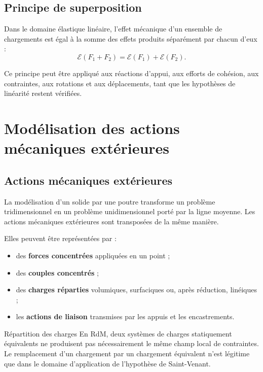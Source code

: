 \subsection{Principe de superposition}

Dans le domaine élastique linéaire, l'effet mécanique d'un ensemble de chargements est égal à la somme des effets produits séparément par chacun d'eux :
\[
\mathcal E(F_1+F_2)=\mathcal E(F_1)+\mathcal E(F_2).
\]

\TLRDMSuperposition

Ce principe peut être appliqué aux réactions d'appui, aux efforts de cohésion, aux contraintes, aux rotations et aux déplacements, tant que les hypothèses de linéarité restent vérifiées.

\section{Modélisation des actions mécaniques extérieures}
\label{sec:rdm-3}

\subsection{Actions mécaniques extérieures}

La modélisation d'un solide par une poutre transforme un problème tridimensionnel en un problème unidimensionnel porté par la ligne moyenne. Les actions mécaniques extérieures sont transposées de la même manière.

Elles peuvent être représentées par :
\begin{itemize}
  \item des \textbf{forces concentrées} appliquées en un point ;
  \item des \textbf{couples concentrés} ;
  \item des \textbf{charges réparties} volumiques, surfaciques ou, après réduction, linéiques ;
  \item les \textbf{actions de liaison} transmises par les appuis et les encastrements.
\end{itemize}

\TLRDMChargesExterieures

\begin{TLWarning}{Répartition des charges}
En RdM, deux systèmes de charges statiquement équivalents ne produisent pas nécessairement le même champ local de contraintes. Le remplacement d'un chargement par un chargement équivalent n'est légitime que dans le domaine d'application de l'hypothèse de Saint-Venant.
\end{TLWarning}

